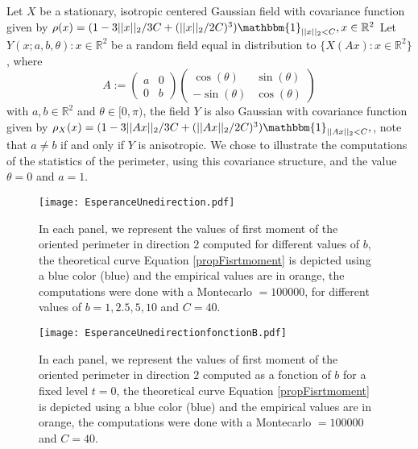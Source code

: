 \documentclass[12pt]{article}
\theoremstyle{Theorem}
\begin{document}
Let $X$ be a stationary, isotropic centered Gaussian field with covariance function given by $\rho(x) = (1 -3||x||_{2}/3C + (||x||_{2}/2C)^{3})\mathbbm{1}_{||x||_{2} < C}, x \in \mathbb{R}^2$
Let ${Y(x; a, b, \theta): x \in \mathbb{R}^{2}}$ be a random field equal in distribution to  $\{X(Ax): x\in \mathbb{R}^{2}\}$, where 
\begin{equation}
A:= \begin{pmatrix} a & 0 \\ 0 & b\end{pmatrix} \begin{pmatrix} \cos(\theta) & \sin(\theta) \\ -\sin(\theta) & \cos(\theta)\end{pmatrix} 
\end{equation}
with $a, b \in \mathbb{R}^{2}$ and $\theta \in [0, \pi)$, the field $Y$ is also Gaussian with covariance function given by  $\rho_{X}(x) = (1 -3||Ax||_{2}/3C + (||Ax||_{2}/2C)^{3})\mathbbm{1}_{||Ax||_{2} < C},$, note that $a\neq b$ if and only if $Y$ is anisotropic. We chose to illustrate the computations of the statistics of the perimeter, using this covariance structure, and the value $\theta = 0$ and $a = 1$. 
\begin{figure}[H]
  \centering
    {\texttt{[image: EsperanceUnedirection.pdf]}}
    \hspace{0.2cm}
 \caption{In each panel, we represent the values of first moment of the oriented perimeter in direction $2$ computed for different values of $b$, the theoretical curve Equation \eqref{propFisrtmoment} is depicted using a blue color (blue) and the empirical values are in orange, the computations were done with a Montecarlo $= 100000$, for different values of $b = 1, 2.5, 5, 10$ and $C = 40$. }
\label{fig2}
\end{figure}

\begin{figure}[H]
  \centering
    {\texttt{[image: EsperanceUnedirectionfonctionB.pdf]}}
    \hspace{0.2cm}
 \caption{In each panel, we represent the values of first moment of the oriented perimeter in direction $2$ computed as a fonction of $b$ for a fixed level $t = 0$, the theoretical curve Equation \eqref{propFisrtmoment} is depicted using a blue color (blue) and the empirical values are in orange, the computations were done with a Montecarlo $= 100000$ and $C = 40$.}
\label{fig2}
\end{figure}
\end{document}
